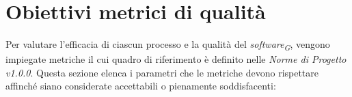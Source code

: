 \section{Obiettivi metrici di qualità}
Per valutare l'efficacia di ciascun processo e la qualità del \textit{software}\textsubscript{\textit{G}}, vengono impiegate metriche il cui quadro di riferimento è definito nelle \textit{Norme di Progetto v1.0.0}. Questa sezione elenca i parametri che le metriche devono rispettare affinché siano considerate accettabili o pienamente soddisfacenti:






